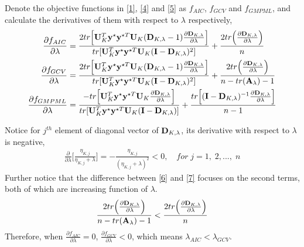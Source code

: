 \documentclass[11pt]{article}
\begin{document}
Denote the objective functions in \eqref{1}, \eqref{4} and \eqref{5} as $f_{AIC}$, $f_{GCV}$ and $f_{GMPML}$, and calculate the derivatives of them with respect to $\lambda$ respectively,
\begin{align}
\frac{\partial f_{AIC}}{\partial \lambda}&=\frac{2tr\Big[{\bf U}_K^T{\bf y}^\star {\bf y}^{\star T}{\bf U}_K({\bf D}_{K, \lambda}-1)\frac{\partial {\bf D}_{K, \lambda}}{\partial \lambda}\Big]}{tr[{\bf U}_K^T{\bf y}^\star {\bf y}^{\star T}{\bf U}_K({\bf I}-{\bf D}_{K, \lambda})^2]}+\frac{2tr\Big(\frac{\partial {\bf D}_{K, \lambda}}{\partial \lambda}\Big)}{n} \label{6} \\
\frac{\partial f_{GCV}}{\partial \lambda}&=\frac{2tr\Big[{\bf U}_K^T{\bf y}^\star {\bf y}^{\star T}{\bf U}_K({\bf D}_{K, \lambda}-1)\frac{\partial {\bf D}_{K, \lambda}}{\partial \lambda}\Big]}{tr[{\bf U}_K^T{\bf y}^\star {\bf y}^{\star T}{\bf U}_K({\bf I}-{\bf D}_{K, \lambda})^2]}+\frac{2tr\Big(\frac{\partial {\bf D}_{K, \lambda}}{\partial \lambda}\Big)}{n-tr({\bf A}_\lambda)-1}  \label{7}\\
\frac{\partial f_{GMPML}}{\partial \lambda}&=\frac{-tr\Big[{\bf U}_K^T{\bf y}^\star {\bf y}^{\star T}{\bf U}_K \frac{\partial {\bf D}_{K, \lambda}}{\partial \lambda}\Big]}{tr[{\bf U}_K^T{\bf y}^\star {\bf y}^{\star T}{\bf U}_K({\bf I}-{\bf D}_{K, \lambda})]}+\frac{tr\Big[({\bf I}-{\bf D}_{K, \lambda})^{-1}\frac{\partial {\bf D}_{K, \lambda}}{\partial \lambda}\Big]}{n-1}
\end{align}

Notice for $j^{th}$ element of diagonal vector of ${\bf D}_{K, \lambda}$, its derivative with respect to $\lambda$ is negative,
\begin{align*}
\frac{\partial }{\partial \lambda}\Big[\frac{\eta_{K, j}}{\eta_{K, j}+\lambda}\Big]=-\frac{\eta_{K, j}}{(\eta_{K, j}+\lambda)^2}<0, \quad for\; j=1,\;2,...,\;n
\end{align*}
Further notice that the difference between \eqref{6} and \eqref{7} focuses on the second terms, both of which are increasing function of $\lambda$.
\begin{align*}
\frac{2tr\Big(\frac{\partial {\bf D}_{K, \lambda}}{\partial \lambda}\Big)}{n-tr({\bf A}_\lambda)-1}<\frac{2tr\Big(\frac{\partial {\bf D}_{K, \lambda}}{\partial \lambda}\Big)}{n}
\end{align*}
Therefore, when $\frac{\partial f_{AIC}}{\partial \lambda}=0$, $\frac{\partial f_{GCV}}{\partial \lambda}<0$, which means $\lambda_{AIC}<\lambda_{GCV}$.\\
\end{document}
